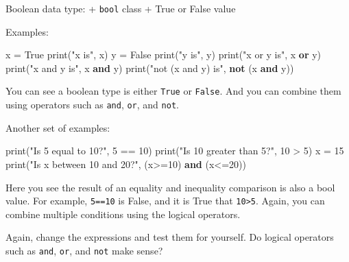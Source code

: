 \documentclass[
  letterpaper,
]{scrbook}
\newenvironment{Shaded}{\begin{snugshade}}{\end{snugshade}}
\newcommand{\BuiltInTok}[1]{\textcolor[rgb]{0.00,0.23,0.31}{#1}}
\newcommand{\DecValTok}[1]{\textcolor[rgb]{0.68,0.00,0.00}{#1}}
\newcommand{\KeywordTok}[1]{\textcolor[rgb]{0.00,0.23,0.31}{\textbf{#1}}}
\newcommand{\NormalTok}[1]{\textcolor[rgb]{0.00,0.23,0.31}{#1}}
\newcommand{\OperatorTok}[1]{\textcolor[rgb]{0.37,0.37,0.37}{#1}}
\newcommand{\StringTok}[1]{\textcolor[rgb]{0.13,0.47,0.30}{#1}}
\newcommand{\VariableTok}[1]{\textcolor[rgb]{0.07,0.07,0.07}{#1}}
\begin{document}

Boolean data type: + \texttt{bool} class + True or False value

Examples:

\begin{Shaded}
\begin{Highlighting}[]
\NormalTok{x }\OperatorTok{=} \VariableTok{True}
\BuiltInTok{print}\NormalTok{(}\StringTok{"x is"}\NormalTok{, x)}
\NormalTok{y }\OperatorTok{=} \VariableTok{False}
\BuiltInTok{print}\NormalTok{(}\StringTok{"y is"}\NormalTok{, y)}
\BuiltInTok{print}\NormalTok{(}\StringTok{"x or y is"}\NormalTok{, x }\KeywordTok{or}\NormalTok{ y)}
\BuiltInTok{print}\NormalTok{(}\StringTok{"x and y is"}\NormalTok{, x }\KeywordTok{and}\NormalTok{ y)}
\BuiltInTok{print}\NormalTok{(}\StringTok{"not (x and y) is"}\NormalTok{, }\KeywordTok{not}\NormalTok{ (x }\KeywordTok{and}\NormalTok{ y))}
\end{Highlighting}
\end{Shaded}

You can see a boolean type is either \texttt{True} or \texttt{False}.
And you can combine them using operators such as \texttt{and},
\texttt{or}, and \texttt{not}.

Another set of examples:

\begin{Shaded}
\begin{Highlighting}[]
\BuiltInTok{print}\NormalTok{(}\StringTok{"Is 5 equal to 10?"}\NormalTok{, }\DecValTok{5} \OperatorTok{==} \DecValTok{10}\NormalTok{)}
\BuiltInTok{print}\NormalTok{(}\StringTok{"Is 10 greater than 5?"}\NormalTok{, }\DecValTok{10} \OperatorTok{\textgreater{}} \DecValTok{5}\NormalTok{)}
\NormalTok{x }\OperatorTok{=} \DecValTok{15}
\BuiltInTok{print}\NormalTok{(}\StringTok{"Is x between 10 and 20?"}\NormalTok{, (x}\OperatorTok{\textgreater{}=}\DecValTok{10}\NormalTok{) }\KeywordTok{and}\NormalTok{ (x}\OperatorTok{\textless{}=}\DecValTok{20}\NormalTok{))}
\end{Highlighting}
\end{Shaded}

Here you see the result of an equality and inequality comparison is also
a bool value. For example, \texttt{5==10} is False, and it is True that
\texttt{10\textgreater{}5}. Again, you can combine multiple conditions
using the logical operators.

Again, change the expressions and test them for yourself. Do logical
operators such as \texttt{and}, \texttt{or}, and \texttt{not} make
sense?
\end{document}
